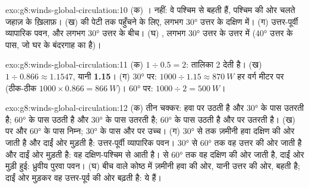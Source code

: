 \begin{solution}{exo:g8:winds-global-circulation:10}
(क) । नहीं: वे पश्चिम से बहती हैं, पश्चिम की ओर चलते जहाज़ के ख़िलाफ़।
(ख)  की पेटी तक पहुँचने के लिए, लगभग \ang{30} उत्तर के दक्षिण में।
(ग) उत्तर-पूर्वी व्यापारिक पवन,  और लगभग \ang{30} उत्तर के बीच।
(घ) , लगभग \ang{30} उत्तर के उत्तर में (\ang{40} उत्तर के पास, जो घर के
बंदरगाह का  है)।
\end{solution}

\begin{solution}{exo:g8:winds-global-circulation:11}
(क) $1 \div 0.5 = 2$: तालिका 2 देती है। (ख) $1 \div 0.866 \approx
1.1547$, यानी
\textbf{1.15}। (ग) \ang{30} पर: $1000 \div 1.15 \approx
\qty{870}{W}$ हर वर्ग
मीटर पर (ठीक-ठीक $1000 \times 0.866 =
\qty{866}{W}$)। \ang{60} पर:
$1000 \div 2 = \qty{500}{W}$।
\end{solution}

\begin{solution}{exo:g8:winds-global-circulation:12}
(क) तीन चक्कर: हवा  पर उठती है और \ang{30} के पास उतरती है; \ang{60} के
पास उठती है और \ang{30} के पास उतरती है; \ang{60} के पास उठती है और  पर उतरती
है। (ख)  पर और \ang{60} के पास निम्न; \ang{30} के पास और  पर उच्च।
(ग) \ang{30} से  तक ज़मीनी हवा दक्षिण की ओर जाती है और दाईं ओर मुड़ती है:
उत्तर-पूर्वी व्यापारिक पवन। \ang{30} से \ang{60} तक वह उत्तर की ओर जाती है और दाईं ओर
मुड़ती है: वह दक्षिण-पश्चिम से आती है।  से \ang{60} तक वह दक्षिण की ओर जाती है,
दाईं ओर मुड़ी हुई: ध्रुवीय पुरवा पवन। (घ) बीच वाले कोष्ठ में ज़मीनी हवा  की ओर,
यानी उत्तर की ओर, बहती है; दाईं ओर मुड़कर वह उत्तर-पूर्व की ओर बढ़ती है: ये  हैं।
\end{solution}

